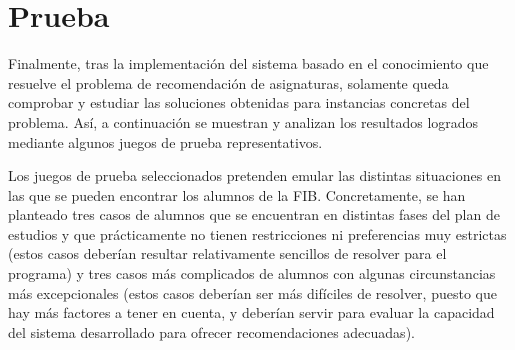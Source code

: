 
\section{Prueba} \label{sec:prueba}

Finalmente, tras la implementación del sistema basado en el conocimiento que 
resuelve el problema de recomendación de asignaturas, solamente queda 
comprobar y estudiar las soluciones obtenidas para instancias concretas del 
problema. Así, a continuación se muestran y analizan los resultados logrados 
mediante algunos juegos de prueba representativos.

Los juegos de prueba seleccionados pretenden emular las distintas situaciones 
en las que se pueden encontrar los alumnos de la FIB. Concretamente, se han 
planteado tres casos de alumnos que se encuentran en distintas fases del plan 
de estudios y que prácticamente no tienen restricciones ni preferencias muy 
estrictas (estos casos deberían resultar relativamente sencillos de resolver 
para el programa) y tres casos más complicados de alumnos con algunas 
circunstancias más excepcionales (estos casos deberían ser más difíciles de 
resolver, puesto que hay más factores a tener en cuenta, y deberían servir 
para evaluar la capacidad del sistema desarrollado para ofrecer 
recomendaciones adecuadas).

















\clearpage


